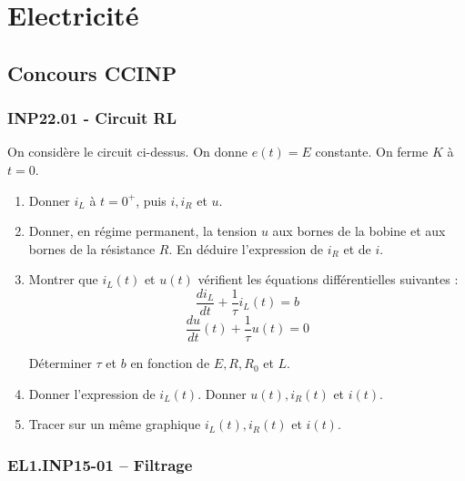 \newpage

\section*{Electricité}

\subsection*{Concours CCINP}

\subsubsection*{INP22.01 - Circuit RL  \lesdeux}

\begin{center}
\end{center}
On considère le circuit ci-dessus. On donne $e(t)=E$ constante. On ferme $K$ à $t=0$. 

\begin{enumerate}
\item Donner $i_L$ à $t=0^+$, puis $i, i_R$ et $u$.
\item Donner, en régime permanent, la tension $u$ aux bornes de la bobine et aux bornes de la résistance $R$. En déduire l'expression de $i_R$ et de $i$.
\item Montrer que $i_L (t)$ et $u(t)$ vérifient les équations différentielles suivantes :
$$
\frac{di_L}{dt}+\frac{1}{\tau} i_L (t)= b   
$$
$$
\frac{du}{dt}(t)+\frac{1}{\tau} u(t)= 0
$$

Déterminer $\tau$  et $b$ en fonction de $E,R,R_0$ et $L$.

\item Donner l'expression de $i_L(t)$. Donner $u(t),i_R (t)$ et $i(t)$.
\item Tracer sur un même graphique $i_L (t),i_R (t)$ et $i(t)$. 

\end{enumerate}

\newpage
\subsubsection*{EL1.INP15-01 -- Filtrage  \lesdeux}

